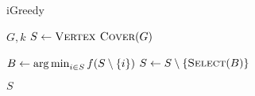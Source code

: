 \begin{algorithm}[t]
  \caption{iGreedy}\label{alg:GREEDY_ALGORITMUS}
  \begin{algorithmic}[1]
    \Require $G, k$
    \State $S \leftarrow \Call{Vertex Cover}{G}$

    \State $B \leftarrow \operatorname*{arg\,min}_{i \in S} f(S \setminus \left\{ i \right\})$
    \State $S \leftarrow S \setminus \left\{ \Call{Select}{B} \right\}$
    \EndWhile

    \State \Return $S$
  \end{algorithmic}
\end{algorithm}
